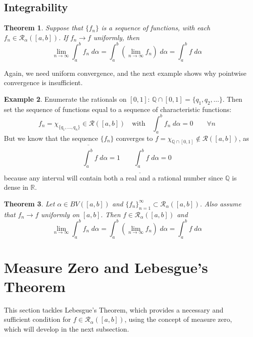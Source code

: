 \documentclass[12pt]{article}
\theoremstyle{plain}
\newtheorem{thm}{Theorem}[subsection]
\theoremstyle{definition}
\newtheorem{ex}[thm]{Example}
\theoremstyle{remark}
\begin{document}
\newpage
\subsection{Integrability}

\begin{thm}
Suppose that $\{f_n\}$ is a sequence of functions, with each $f_n\in\mathscr{R}_\alpha([a,b])$. If $f_n\rightarrow f$ uniformly,
then 
\[ 
    \lim_{n\rightarrow\infty} \int^b_a f_n\;d\alpha
    = \int^b_a \left(\lim_{n\rightarrow\infty} f_n \right)\;
    d\alpha = \int^b_a f\;d\alpha
\]
\end{thm}

Again, we need uniform convergence, and the next example shows why pointwise convergence is insufficient.

\begin{ex}
    \label{Qex}
    Enumerate the rationals on $[0,1]$: $\mathbb{Q}\cap[0,1] = \{q_1, q_2, \ldots\}$. Then set the sequence of functions equal to a sequence of characteristic functions:
\[ 
    f_n = \chi_{\{q_1, \ldots, q_n\}} \in \mathscr{R}([a,b])
    \quad \text{with} \quad
    \int^b_a f_n \; d\alpha = 0
    \qquad \forall n
\]
But we know that the sequence $\{f_n\}$ converges to $f=\chi_{\mathbb{Q}\cap [0,1]}\not\in\mathscr{R}([a,b])$, as
\[
    \overline{\int_a^b} f \; d\alpha = 1 
    \qquad 
    \underline{\int_a^b} f \; d\alpha = 0
\]
because any interval will contain both a real and a rational number since $\mathbb{Q}$ is dense in $\mathbb{R}$.
\end{ex}

\begin{thm}
Let $\alpha\in BV([a,b])$ and $\{f_n\}_{n=1}^\infty\subset \mathscr{R}_\alpha([a,b])$. Also assume that $f_n\rightarrow f$ uniformly on $[a,b]$. Then $f\in\mathscr{R}_\alpha([a,b])$ and 
\[ 
    \lim_{n\rightarrow\infty} \int^b_a f_n\;d\alpha
    = \int^b_a \left(\lim_{n\rightarrow\infty} f_n \right)\;
    d\alpha = \int^b_a f\;d\alpha
\]

\end{thm}



\section{Measure Zero and Lebesgue's Theorem}

This section tackles Lebesgue's Theorem, which provides a necessary and sufficient condition for $f\in\mathscr{R}_\alpha([a,b])$, using the concept of measure zero, which will develop in the next subsection.
\end{document}
